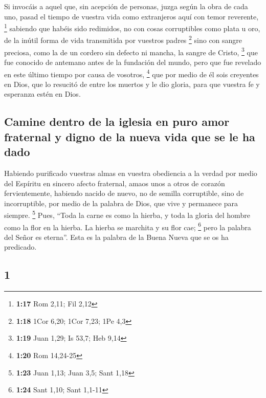 \begin{paracol}{2}
 Si invocáis a aquel que, sin acepción de personas, juzga
según la obra de cada uno, pasad el tiempo de vuestra vida como
extranjeros aquí con temor reverente, \footnote{\textbf{1:17} Rom 2,11;
  Fil 2,12}  sabiendo que habéis sido redimidos, no con
cosas corruptibles como plata u oro, de la inútil forma de vida
transmitida por vuestros padres \footnote{\textbf{1:18} 1Cor 6,20; 1Cor
  7,23; 1Pe 4,3}  sino con sangre preciosa, como la de un
cordero sin defecto ni mancha, la sangre de Cristo, \footnote{\textbf{1:19}
  Juan 1,29; Is 53,7; Heb 9,14}  que fue conocido de
antemano antes de la fundación del mundo, pero que fue revelado en este
último tiempo por causa de vosotros, \footnote{\textbf{1:20} Rom
  14,24-25}  que por medio de él sois creyentes en Dios,
que lo resucitó de entre los muertos y le dio gloria, para que vuestra
fe y esperanza estén en Dios.

\hypertarget{camine-dentro-de-la-iglesia-en-puro-amor-fraternal-y-digno-de-la-nueva-vida-que-se-le-ha-dado}{%
\subsection{Camine dentro de la iglesia en puro amor fraternal y digno
de la nueva vida que se le ha
dado}\label{camine-dentro-de-la-iglesia-en-puro-amor-fraternal-y-digno-de-la-nueva-vida-que-se-le-ha-dado}}

 Habiendo purificado vuestras almas en vuestra obediencia
a la verdad por medio del Espíritu en sincero afecto fraternal, amaos
unos a otros de corazón fervientemente,  habiendo nacido
de nuevo, no de semilla corruptible, sino de incorruptible, por medio de
la palabra de Dios, que vive y permanece para siempre. \footnote{\textbf{1:23}
  Juan 1,13; Juan 3,5; Sant 1,18}  Pues, ``Toda la carne
es como la hierba, y toda la gloria del hombre como la flor en la
hierba. La hierba se marchita y su flor cae; \footnote{\textbf{1:24}
  Sant 1,10; Sant 1,1-11}  pero la palabra del Señor es
eterna''. Esta es la palabra de la Buena Nueva que se os ha predicado.

\switchcolumn
\begin{otherlanguage}{english}

\hypertarget{section-1}{%
\section{1}\label{section-1}}


\end{otherlanguage}
\end{paracol}
